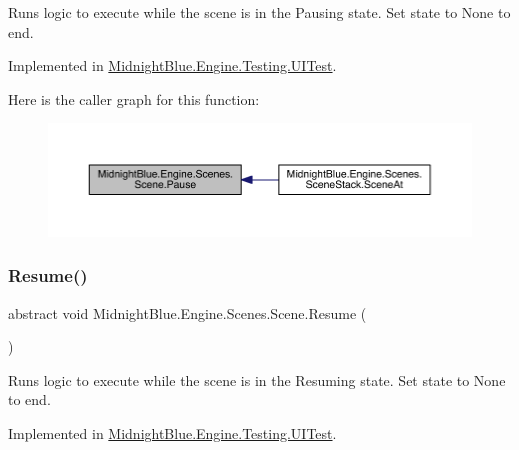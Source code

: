 Runs logic to execute while the scene is in the Pausing state. Set state to None to end. 



Implemented in \hyperlink{class_midnight_blue_1_1_engine_1_1_testing_1_1_u_i_test_ae7b12fd4ac0f143158c750c45e0775ce}{Midnight\+Blue.\+Engine.\+Testing.\+U\+I\+Test}.

Here is the caller graph for this function\+:
\nopagebreak
\begin{figure}[H]
\begin{center}
\leavevmode
\includegraphics[width=350pt]{class_midnight_blue_1_1_engine_1_1_scenes_1_1_scene_aeb3c4d9bea0177d21fbffcdabab660de_icgraph}
\end{center}
\end{figure}
\hypertarget{class_midnight_blue_1_1_engine_1_1_scenes_1_1_scene_ab7cd837b20785116007a4732d90bc548}{}\label{class_midnight_blue_1_1_engine_1_1_scenes_1_1_scene_ab7cd837b20785116007a4732d90bc548} 
\subsubsection{\texorpdfstring{Resume()}{Resume()}}
{\footnotesize\ttfamily abstract void Midnight\+Blue.\+Engine.\+Scenes.\+Scene.\+Resume (\begin{DoxyParamCaption}{ }\end{DoxyParamCaption})\hspace{0.3cm}{\ttfamily [pure virtual]}}



Runs logic to execute while the scene is in the Resuming state. Set state to None to end. 



Implemented in \hyperlink{class_midnight_blue_1_1_engine_1_1_testing_1_1_u_i_test_a0c0ac7a8acf10482982ee63756605f61}{Midnight\+Blue.\+Engine.\+Testing.\+U\+I\+Test}.

